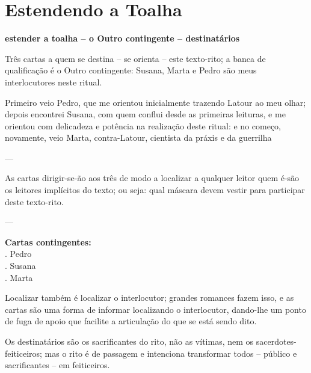 \chapter{Estendendo a Toalha}
\label{cap:toalha}

{\bfseries estender a toalha -- o Outro contingente -- destinatários}

Três cartas a quem se destina -- se orienta -- este texto-rito;
    a banca de qualificação é o Outro contingente:
        Susana, Marta e Pedro são meus interlocutores neste ritual.

Primeiro veio Pedro, que me orientou inicialmente trazendo Latour ao meu olhar;
    depois encontrei Susana, com quem conflui desde as primeiras leituras, e me orientou com delicadeza e potência na realização deste ritual:
        e no começo, novamente, veio Marta, contra-Latour, cientista da práxis e da guerrilha

---

As cartas dirigir-se-ão aos três de modo a localizar a qualquer leitor quem é-são os leitores implícitos do texto;
    ou seja:
        qual máscara devem vestir para participar deste texto-rito.

---

{\bfseries Cartas contingentes:\\[+5pt]}
    \hspace*{2cm}. Pedro\\
    \hspace*{2cm}. Susana\\
    \hspace*{2cm}. Marta

Localizar também é localizar o interlocutor;
    grandes romances fazem isso, e as cartas são uma forma de informar localizando o interlocutor, dando-lhe um ponto de fuga de apoio que facilite a articulação do que se está sendo dito.

Os destinatários são os sacrificantes do rito, não as vítimas, nem os sacerdotes-feiticeiros;
    mas o rito é de passagem e intenciona transformar todos -- público e sacrificantes -- em feiticeiros.